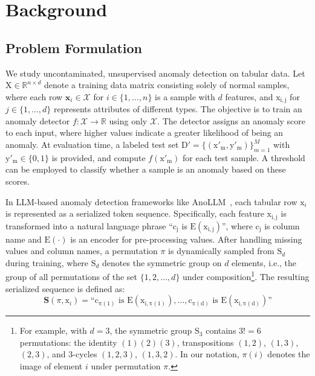 \section{Background}

\subsection{Problem Formulation}
We study uncontaminated, unsupervised anomaly detection on tabular data. Let $\mathrm{X} \in \mathbb{R}^{n \times d}$ denote a training data matrix consisting solely of normal samples, where each row $\mathbf{x}_i \in \mathcal{X}$ for $i \in \{1, \dots, n\}$ is a sample with $d$ features, and $\mathrm{x_{i,j}}$ for $j \in \{1, \dots, d\}$ represents attributes of different types. The objective is to train an anomaly detector $f: \mathcal{X} \to \mathbb{R}$ using only $\mathcal{X}$. The detector assigns an anomaly score to each input, where higher values indicate a greater likelihood of being an anomaly. At evaluation time, a labeled test set $\mathrm{D'} = \{(\mathrm{x'_m}, \mathrm{y'_m})\}_{m=1}^{M}$ with $\mathrm{y'_m}\in\{0,1\}$ is provided, and compute $f(\mathrm{x'_m})$ for each test sample. A threshold can be employed to classify whether a sample is an anomaly based on these scores.


In LLM-based anomaly detection frameworks like AnoLLM~\citep{tsai2025anollm}, each tabular row $\mathrm{x}_i$ is represented as a serialized token sequence. Specifically, each feature $\mathrm{x_{i,j}}$ is transformed into a natural language phrase ``$\mathrm{c_j}$ is $\mathrm{E}(\mathrm{x_{i,j}})$'', where $\mathrm{c_j}$ is column name and $\mathrm{E}(\cdot)$ is an encoder for pre-processing values. After handling missing values and column names, a permutation $\pi$ is dynamically sampled from $\mathrm{S}_d$ during training, where $\mathrm{S}_d$ denotes the symmetric group on $d$ elements, i.e., the group of all permutations of the set $\{1, 2, \ldots, d\}$ under composition\footnote{For example, with $d=3$, the symmetric group $\mathrm{S}_3$ contains $3! = 6$ permutations: the identity $(1)(2)(3)$, transpositions $(1,2)$, $(1,3)$, $(2,3)$, and 3-cycles $(1,2,3)$, $(1,3,2)$. In our notation, $\pi(i)$ denotes the image of element $i$ under permutation $\pi$.}. The resulting serialized sequence is defined as:
\begin{equation*}
\mathbf{S}(\pi, \mathrm{x}_i) = \text{``} \mathrm{c_{\pi(1)}} \text{ is } \mathrm{E}(\mathrm{x_{i,\pi(1)}}), \dots, \mathrm{c_{\pi(d)}} \text{ is } \mathrm{E}(\mathrm{x_{i,\pi(d)}}) \text{''}
\end{equation*}

